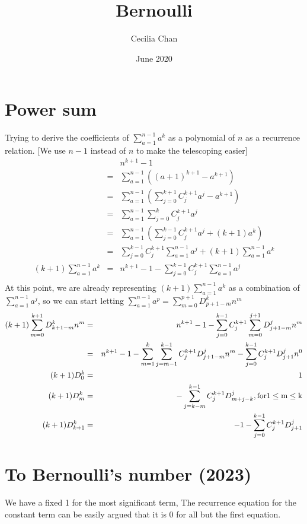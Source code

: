 \documentclass{article}
\title{Bernoulli}
\author{Cecilia Chan}
\date{June 2020}
\begin{document}
\maketitle
\section{Power sum}
Trying to derive the coefficients of $ \sum\limits_{a=1}^{n-1} a^k $ as a polynomial of $ n $ as a recurrence relation. [We use $ n - 1 $ instead of $ n $ to make the telescoping easier]
\begin{eqnarray*}
& & n^{k+1} - 1 \\
  &=& \sum\limits_{a=1}^{n-1} \left((a + 1)^{k+1} - a^{k+1}\right) \\
  &=& \sum\limits_{a=1}^{n-1} \left(\sum\limits_{j=0}^{k+1}C_j^{k+1}a^j - a^{k+1}\right) \\
  &=& \sum\limits_{a=1}^{n-1} \sum\limits_{j=0}^{k}C_j^{k+1}a^j \\
  &=& \sum\limits_{a=1}^{n-1} \left(\sum\limits_{j=0}^{k-1}C_j^{k+1}a^j + (k+1)a^k \right) \\
  &=& \sum\limits_{j=0}^{k-1}C_j^{k+1}\sum\limits_{a=1}^{n-1} a^j + (k+1)\sum\limits_{a=1}^{n-1} a^k \\  
  (k+1)\sum\limits_{a=1}^{n-1} a^k &=& n^{k+1} - 1 - \sum\limits_{j=0}^{k-1}C_j^{k+1}\sum\limits_{a=1}^{n-1} a^j \\
\end{eqnarray*}
At this point, we are already representing $ (k+1)\sum\limits_{a=1}^{n-1} a^k $ as a combination of $ \sum\limits_{a=1}^{n-1} a^j $, so we can start letting $ \sum\limits_{a=1}^{n-1} a^p = \sum\limits_{m=0}^{p+1}D_{p+1-m}^kn^m $
\begin{eqnarray*}
  (k+1)\sum\limits_{m=0}^{k+1}D_{k+1-m}^kn^m &=& n^{k+1} - 1 - \sum\limits_{j=0}^{k-1}C_j^{k+1}\sum\limits_{m=0}^{j+1}D_{j+1-m}^jn^m \\
  &=& n^{k+1} - 1 - \sum\limits_{m=1}^{k}\sum\limits_{j=m-1}^{k-1}C_j^{k+1}D_{j+1-m}^jn^m - \sum\limits_{j=0}^{k-1}C_j^{k+1}D_{j+1}^jn^0 \\
  (k+1)D_0^k &=& 1 \\
  (k+1)D_m^k &=& -\sum\limits_{j=k-m}^{k-1}C_j^{k+1}D_{m+j-k}^j  \rm {, for } 1 \le m \le k \\
  (k+1)D_{k+1}^k &=& -1 -\sum\limits_{j=0}^{k-1}C_j^{k+1}D_{j+1}^j
\end{eqnarray*}

\section{To Bernoulli's number (2023)}
We have a fixed 1 for the most significant term, The recurrence equation for the constant term can be easily argued that it is 0 for all but the first equation.
\end{document}
